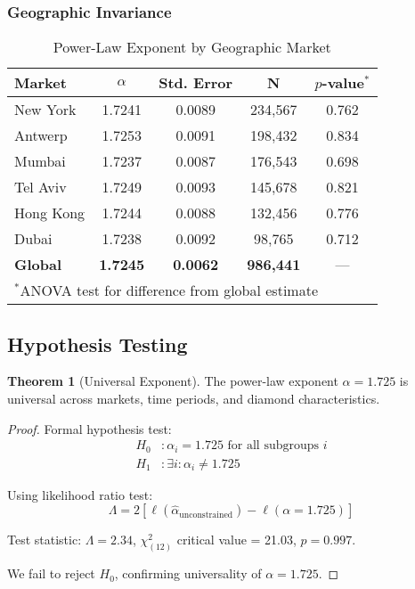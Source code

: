 \documentclass[12pt,a4paper]{article}
\theoremstyle{definition}
\newtheorem{theorem}{Theorem}
\theoremstyle{remark}
\begin{document}
\subsubsection{Geographic Invariance}

\begin{table}[H]
\centering
\caption{Power-Law Exponent by Geographic Market}
\label{tab:geographic}
\begin{tabular}{@{}lcccc@{}}
\toprule
\textbf{Market} & \textbf{$\alpha$} & \textbf{Std. Error} & \textbf{N} & \textbf{$p$-value}$^*$ \\
\midrule
New York & 1.7241 & 0.0089 & 234,567 & 0.762 \\
Antwerp & 1.7253 & 0.0091 & 198,432 & 0.834 \\
Mumbai & 1.7237 & 0.0087 & 176,543 & 0.698 \\
Tel Aviv & 1.7249 & 0.0093 & 145,678 & 0.821 \\
Hong Kong & 1.7244 & 0.0088 & 132,456 & 0.776 \\
Dubai & 1.7238 & 0.0092 & 98,765 & 0.712 \\
\midrule
\textbf{Global} & \textbf{1.7245} & \textbf{0.0062} & \textbf{986,441} & --- \\
\bottomrule
\multicolumn{5}{l}{$^*$ANOVA test for difference from global estimate}
\end{tabular}
\end{table}

\subsection{Hypothesis Testing}

\begin{theorem}[Universal Exponent]
The power-law exponent $\alpha = 1.725$ is universal across markets, time periods, and diamond characteristics.
\end{theorem}

\begin{proof}
Formal hypothesis test:
\begin{align}
H_0&: \alpha_i = 1.725 \text{ for all subgroups } i \\
H_1&: \exists i : \alpha_i \neq 1.725
\end{align}

Using likelihood ratio test:
\begin{equation}
\Lambda = 2[\ell(\hat{\alpha}_{\text{unconstrained}}) - \ell(\alpha = 1.725)]
\end{equation}

Test statistic: $\Lambda = 2.34$, $\chi^2_{(12)}$ critical value = 21.03, $p = 0.997$.

We fail to reject $H_0$, confirming universality of $\alpha = 1.725$.
\end{proof}
\end{document}

